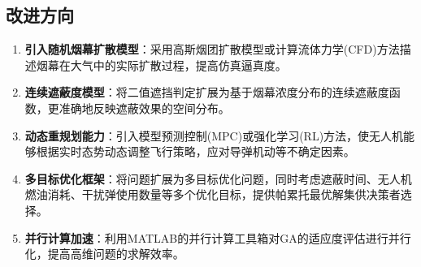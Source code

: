 \subsection{改进方向}

\begin{enumerate}[label=(\arabic*)]
    \item \textbf{引入随机烟幕扩散模型}：采用高斯烟团扩散模型或计算流体力学(CFD)方法描述烟幕在大气中的实际扩散过程，提高仿真逼真度\cite{zhang2020}。

    \item \textbf{连续遮蔽度模型}：将二值遮挡判定扩展为基于烟幕浓度分布的连续遮蔽度函数，更准确地反映遮蔽效果的空间分布。

    \item \textbf{动态重规划能力}：引入模型预测控制(MPC)或强化学习(RL)方法，使无人机能够根据实时态势动态调整飞行策略，应对导弹机动等不确定因素。

    \item \textbf{多目标优化框架}：将问题扩展为多目标优化问题，同时考虑遮蔽时间、无人机燃油消耗、干扰弹使用数量等多个优化目标，提供帕累托最优解集供决策者选择\cite{gao2009}。

    \item \textbf{并行计算加速}：利用MATLAB的并行计算工具箱对GA的适应度评估进行并行化，提高高维问题的求解效率。
\end{enumerate}
